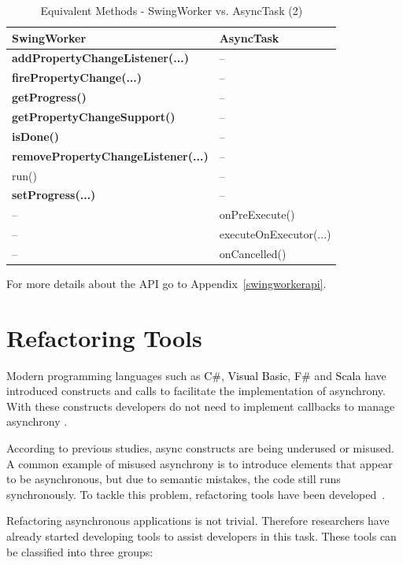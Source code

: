 \documentclass[type=bsc,accentcolor=tud9c]{tudthesis}
\newcommand{\framework}[1]{\textcolor{black}{#1}}
\begin{document}
\begin{table}[h]
{\small
\begin{center}
\begin{tabular}{|C{6cm} | C{6cm}|}
\hline
\bfseries SwingWorker~\cite{swingworkerapi} & \bfseries AsyncTask~\cite{ulrAndroidAsyncTask}\\\hline
\bfseries addPropertyChangeListener(...) & --\\
\bfseries firePropertyChange(...) & --\\
\bfseries getProgress() & --\\
\bfseries getPropertyChangeSupport() & --\\
\bfseries isDone() & --\\
\bfseries removePropertyChangeListener(...)& --\\
run()& --\\
\bfseries setProgress(...)& --\\\hline
-- & onPreExecute() \\
-- & executeOnExecutor(...)\\
-- & onCancelled()\\\hline
\end{tabular}
\end{center}
\caption{Equivalent Methods - SwingWorker vs. AsyncTask (2)}
\label{table:worker-task-non-equivalent}
}
\end{table}

For more details about the  API go to Appendix~\ref{swingworkerapi}. 

\section{Refactoring Tools}
\label{sec:refactoring-tools}
Modern programming languages such as \framework{C\#}, \framework{Visual Basic}, \framework{F\#} and \framework{Scala} have introduced  constructs and  calls to facilitate the implementation of asynchrony. With these constructs developers do not need to implement callbacks to manage asynchrony \cite{paperAsyncMobile}. 

According to previous studies, async constructs are being underused or misused. A common example of misused asynchrony is to introduce elements that appear to be asynchronous, but due to semantic mistakes, the code still runs synchronously. To tackle this problem, refactoring tools have been developed~\cite{paperAsyncMobile}. 

Refactoring asynchronous applications is not trivial. Therefore researchers have already started developing tools to assist developers in this task. These tools can be classified into three groups:
\end{document}

